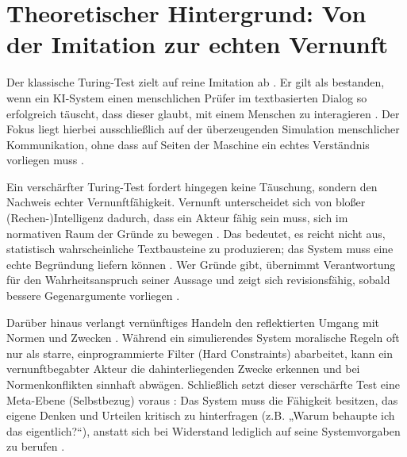
\section{Theoretischer Hintergrund: Von der Imitation zur echten Vernunft}

Der klassische Turing-Test zielt auf reine Imitation ab . Er gilt als bestanden, wenn ein KI-System einen menschlichen Prüfer im textbasierten Dialog so erfolgreich täuscht, dass dieser glaubt, mit einem Menschen zu interagieren . Der Fokus liegt hierbei ausschließlich auf der überzeugenden Simulation menschlicher Kommunikation, ohne dass auf Seiten der Maschine ein echtes Verständnis vorliegen muss .

Ein verschärfter Turing-Test fordert hingegen keine Täuschung, sondern den Nachweis echter Vernunftfähigkeit. Vernunft unterscheidet sich von bloßer (Rechen-)Intelligenz dadurch, dass ein Akteur fähig sein muss, sich im normativen Raum der Gründe zu bewegen . Das bedeutet, es reicht nicht aus, statistisch wahrscheinliche Textbausteine zu produzieren; das System muss eine echte Begründung liefern können . Wer Gründe gibt, übernimmt Verantwortung für den Wahrheitsanspruch seiner Aussage und zeigt sich revisionsfähig, sobald bessere Gegenargumente vorliegen .

Darüber hinaus verlangt vernünftiges Handeln den reflektierten Umgang mit Normen und Zwecken . Während ein simulierendes System moralische Regeln oft nur als starre, einprogrammierte Filter (Hard Constraints) abarbeitet, kann ein vernunftbegabter Akteur die dahinterliegenden Zwecke erkennen und bei Normenkonflikten sinnhaft abwägen. Schließlich setzt dieser verschärfte Test eine Meta-Ebene (Selbstbezug) voraus : Das System muss die Fähigkeit besitzen, das eigene Denken und Urteilen kritisch zu hinterfragen (z.B. „Warum behaupte ich das eigentlich?“), anstatt sich bei Widerstand lediglich auf seine Systemvorgaben zu berufen .
